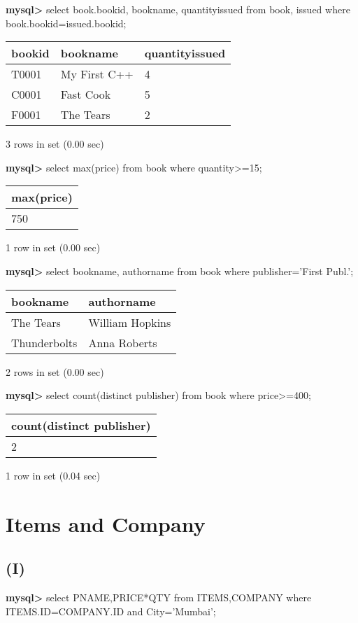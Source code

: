 \documentclass[11pt]{article}
\begin{document}
\textbf{mysql>} select book.bookid, bookname, quantityissued from book, issued where book.bookid=issued.bookid;
\begin{center}
\begin{tabular}{|l|l|l|}
\hline
bookid & bookname & quantityissued \\
\hline
T0001 & My First C++ & 4 \\
C0001 & Fast Cook & 5 \\
F0001 & The Tears & 2 \\
\hline
\end{tabular}
\end{center}
3 rows in set (0.00 sec)

\textbf{mysql>} select max(price) from book where quantity>=15;
\begin{center}
\begin{tabular}{|l|}
\hline
max(price) \\
\hline
750 \\
\hline
\end{tabular}
\end{center}
1 row in set (0.00 sec)

\textbf{mysql>} select bookname, authorname from book where publisher='First Publ.';
\begin{center}
\begin{tabular}{|l|l|}
\hline
bookname & authorname \\
\hline
The Tears & William Hopkins \\
Thunderbolts & Anna Roberts \\
\hline
\end{tabular}
\end{center}
2 rows in set (0.00 sec)

\textbf{mysql>} select count(distinct publisher) from book where price>=400;
\begin{center}
\begin{tabular}{|l|}
\hline
count(distinct publisher) \\
\hline
2 \\
\hline
\end{tabular}
\end{center}
1 row in set (0.04 sec)

\section{Items and Company}
\label{sec:orgd74b8d0}
\subsection{(I)}
\label{sec:orgd2723a2}
\textbf{mysql>} select PNAME,PRICE*QTY from ITEMS,COMPANY where ITEMS.ID=COMPANY.ID and City='Mumbai';
\end{document}
